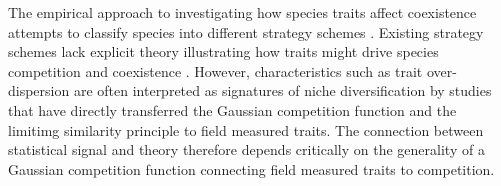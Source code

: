 \documentclass[a4paper,11pt]{article}
\begin{document}
The empirical approach to investigating how species traits affect
coexistence attempts to classify species into different strategy
schemes
\citep{Grime-1974,Grime-1979,Southwood-1977,Weiher-1999,Westoby-2002}.
%
%
Existing strategy schemes lack explicit theory illustrating how traits
might drive species competition and coexistence \citep{Adler-2013}.
However, characteristics such as trait over-dispersion are often
interpreted as
signatures of niche diversification \citep[e.g.][]{Kraft-2008} by
 studies that have directly transferred the Gaussian competition function and the limitimg similarity principle  to field measured traits.
The connection between statistical signal and theory therefore depends
critically on the generality of a Gaussian competition function
connecting field measured traits to competition.
\end{document}
